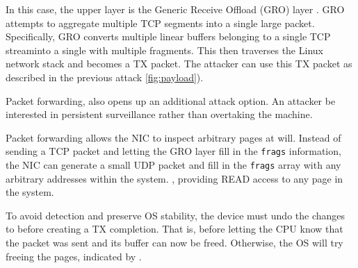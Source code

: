 In this case, the upper layer is the Generic Receive Offload (GRO) layer \cite{gro}. \DIFaddbegin {}\DIFaddend GRO attempts to aggregate multiple TCP segments into a single large packet. Specifically, \DIFaddbegin {}\DIFaddend GRO converts multiple linear \skb{} buffers \DIFdelbegin \DIFdel{(}\DIFdelend belonging to a single TCP stream\DIFdelbegin \DIFdel{) }\DIFdelend \DIFaddbegin \DIFadd{, }\DIFaddend into a single \skb{} with multiple fragments. This \skb{} then traverses the Linux network stack and becomes a TX packet. The attacker can use this TX packet as described in the previous attack \DIFdelbegin {}\DIFdelend \DIFaddbegin {}\DIFaddend \ref{fig:payload}).

Packet forwarding, also opens up an additional attack option. An attacker \DIFdelbegin {}\DIFdelend \DIFaddbegin {}\DIFaddend be interested in persistent surveillance rather than overtaking the machine. \DIFdelbegin %

\DIFdelend Packet forwarding allows the NIC to inspect arbitrary pages at will. 
Instead of sending a TCP packet and letting the GRO layer fill in the \texttt{frags} information, the NIC can generate a small UDP packet and fill in the \texttt{frags} array with any arbitrary \page{} addresses within the system. \DIFdelbegin {}\DIFdelend \DIFaddbegin {}\DIFaddend , providing READ access to \DIFaddbegin {}\DIFaddend any page in the system\DIFdelbegin {}\DIFdelend . 


To avoid detection and preserve OS stability, the device must undo the changes to \shinfo{} before creating a TX completion. That is, before letting the CPU know that the packet was sent and its buffer can now be freed. Otherwise, the OS will try freeing the pages, indicated by \shinfo.


